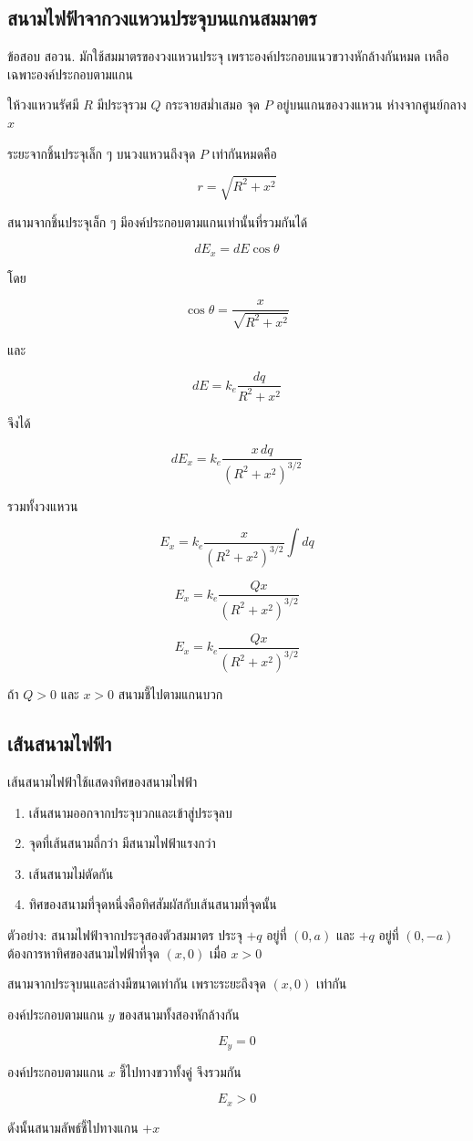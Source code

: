 \subsection{สนามไฟฟ้าจากวงแหวนประจุบนแกนสมมาตร}

ข้อสอบ สอวน. มักใช้สมมาตรของวงแหวนประจุ เพราะองค์ประกอบแนวขวางหักล้างกันหมด เหลือเฉพาะองค์ประกอบตามแกน

ให้วงแหวนรัศมี $R$ มีประจุรวม $Q$ กระจายสม่ำเสมอ จุด $P$ อยู่บนแกนของวงแหวน ห่างจากศูนย์กลาง $x$

ระยะจากชิ้นประจุเล็ก ๆ บนวงแหวนถึงจุด $P$ เท่ากันหมดคือ

\[
r=\sqrt{R^2+x^2}
\]

สนามจากชิ้นประจุเล็ก ๆ มีองค์ประกอบตามแกนเท่านั้นที่รวมกันได้

\[
dE_x=dE\cos\theta
\]

โดย

\[
\cos\theta=\frac{x}{\sqrt{R^2+x^2}}
\]

และ

\[
dE=k_e\frac{dq}{R^2+x^2}
\]

จึงได้

\[
dE_x=k_e\frac{x\,dq}{(R^2+x^2)^{3/2}}
\]

รวมทั้งวงแหวน

\[
E_x=k_e\frac{x}{(R^2+x^2)^{3/2}}\int dq
\]

\[
E_x=k_e\frac{Qx}{(R^2+x^2)^{3/2}}
\]

\begin{tcolorbox}[title=สนามไฟฟ้าบนแกนของวงแหวนประจุ]
\[
E_x=k_e\frac{Qx}{(R^2+x^2)^{3/2}}
\]

ถ้า $Q>0$ และ $x>0$ สนามชี้ไปตามแกนบวก
\end{tcolorbox}

\subsection{เส้นสนามไฟฟ้า}

เส้นสนามไฟฟ้าใช้แสดงทิศของสนามไฟฟ้า

\begin{enumerate}
    \item เส้นสนามออกจากประจุบวกและเข้าสู่ประจุลบ
    \item จุดที่เส้นสนามถี่กว่า มีสนามไฟฟ้าแรงกว่า
    \item เส้นสนามไม่ตัดกัน
    \item ทิศของสนามที่จุดหนึ่งคือทิศสัมผัสกับเส้นสนามที่จุดนั้น
\end{enumerate}

\begin{examplebox}{ตัวอย่าง: สนามไฟฟ้าจากประจุสองตัวสมมาตร}
ประจุ $+q$ อยู่ที่ $(0,a)$ และ $+q$ อยู่ที่ $(0,-a)$ ต้องการหาทิศของสนามไฟฟ้าที่จุด $(x,0)$ เมื่อ $x>0$

สนามจากประจุบนและล่างมีขนาดเท่ากัน เพราะระยะถึงจุด $(x,0)$ เท่ากัน

องค์ประกอบตามแกน $y$ ของสนามทั้งสองหักล้างกัน

\[
E_y=0
\]

องค์ประกอบตามแกน $x$ ชี้ไปทางขวาทั้งคู่ จึงรวมกัน

\[
E_x>0
\]

ดังนั้นสนามลัพธ์ชี้ไปทางแกน $+x$
\end{examplebox}

